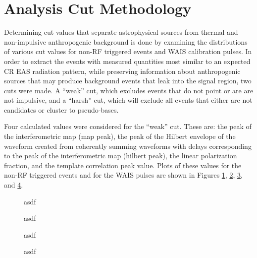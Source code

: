 \section{Analysis Cut Methodology}
	Determining cut values that separate astrophysical sources from thermal and non-impulsive anthropogenic background is done by examining the distributions of various cut values for non-RF triggered events and WAIS calibration pulses.  In order to extract the events with measured quantities most similar to an expected CR EAS radiation pattern, while preserving information about anthropogenic sources that may produce background events that leak into the signal region, two cuts were made. A ``weak'' cut, which excludes events that do not point or are are not impulsive, and a ``harsh'' cut, which will exclude all events that either are not candidates or cluster to pseudo-bases.
	
	Four calculated values were considered for the ``weak'' cut.  These are: the peak of the interferometric map (map peak), the peak of the Hilbert envelope of the waveform created from coherently summing waveforms with delays corresponding to the peak of the interferometric map (hilbert peak), the linear polarization fraction, and the template correlation peak value.  Plots of these values for the non-RF triggered events and for the WAIS pulses are shown in Figures \ref{fig:mapPeakCut}, \ref{fig:hilbertCut}, \ref{fig:linPolCut}, and \ref{fig:tempCorrCut}.
	
	
\begin{figure}
	\centering
	\caption{asdf} 
	\label{fig:mapPeakCut}
\end{figure}
	
\begin{figure}
	\centering
	\caption{asdf} 
	\label{fig:hilbertCut}
\end{figure}

\begin{figure}
	\centering
	\caption{asdf} 
	\label{fig:linPolCut}
\end{figure}

\begin{figure}
	\centering
	\caption{asdf} 
	\label{fig:tempCorrCut}
\end{figure}
	
	

	
	
	
	